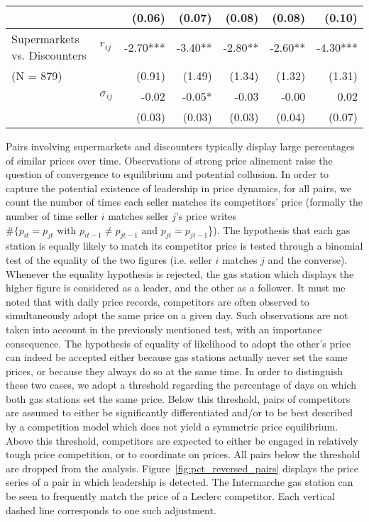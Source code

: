 \documentclass[english]{article}
\begin{document}
\begin{table}[hbtp]
\begin{threeparttable}
\begin{tabular}{llrrrrr}
          &       & (0.06) & (0.07) & (0.08) & (0.08) & (0.10) \\
\midrule
    \multicolumn{1}{l}{Supermarkets vs. Discounters} & \multicolumn{1}{l}{$r_{ij}$} & -2.70*** & -3.40** & -2.80** & -2.60** & -4.30*** \\
    \multicolumn{1}{l}{(N = 879)} &       & (0.91) & (1.49) & (1.34) & (1.32) & (1.31) \\
          & \multicolumn{1}{l}{$\sigma_{ij}$} & -0.02 & -0.05* & -0.03 & -0.00 & 0.02 \\
          &       & (0.03) & (0.03) & (0.03) & (0.04) & (0.07) \\
\bottomrule
\bottomrule
\end{tabular}
\end{threeparttable}
\end{table}

Pairs involving supermarkets and discounters typically display large percentages of similar prices over time. Observations of strong price alinement raise the question of convergence to equilibrium and potential collusion. In order to capture the potential existence of leadership in price dynamics, for all pairs, we count the number of times each seller matches its competitors' price (formally the number of time seller $i$ matches seller $j$'s price writes $\#\{p_{it} = p_{jt} \text{ with } p_{it-1} \neq p_{jt-1} \text{ and } p_{jt} = p_{jt-1}$\}). The hypothesis that each gas station is equally likely to match its competitor price is tested through a binomial test of the equality of the two figures (i.e. seller $i$ matches $j$ and the converse). Whenever the equality hypothesis is rejected, the gas station which displays the higher figure is considered as a leader, and the other as a follower. It must me noted that with daily price records, competitors are often observed to simultaneously adopt the same price on a given day. Such observations are not taken into account in the previously mentioned test, with an importance consequence. The hypothesis of equality of likelihood to adopt the other's price can indeed be accepted either because gas stations actually never set the same prices, or because they always do so at the same time. In order to distinguish these two cases, we adopt a threshold regarding the percentage of days on which both gas stations set the same price. Below this threshold, pairs of competitors are assumed to either be significantly differentiated and/or to be best described by a competition model which does not yield a symmetric price equilibrium. Above this threshold, competitors are expected to either be engaged in relatively tough price competition, or to coordinate on prices. All pairs below the threshold are dropped from the analysis. Figure~\ref{fig:pct_reversed_pairs} displays the price series of a pair in which leadership is detected. The Intermarche gas station can be seen to frequently match the price of a Leclerc competitor. Each vertical dashed line corresponds to one such adjustment.
\end{document}
